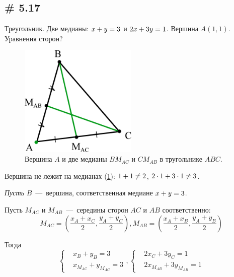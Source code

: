\documentclass[a4paper,12pt]{article}
\begin{document}
  
  \subsection{\# 5.17}
  
  \begin{problem}
      Треугольник.
      Две медианы: $x \hm+ y \hm= 3$ и $2x \hm+ 3y \hm= 1$.
      Вершина $A(1, 1)$.
      Уравнения сторон?
  \end{problem}
  
  \begin{solution}
    \begin{figure}[h]
      \centering
      
      \includegraphics[width=0.5\textwidth]{5-17}
      
      \caption{Вершина $A$ и две медианы $BM_{AC}$ и $CM_{AB}$ в тругольнике $ABC$.}
      \label{fig:5-17}
    \end{figure}
  
    Вершина не лежит на медианах (\ref{fig:5-17}): $1 \hm+ 1 \hm{\not=} 2$, $2 \hm\cdot 1 \hm+ 3 \hm\cdot 1 \hm{\not=} 3$.

    \emph{Пусть} $B$~---~вершина, соответственная медиане $x \hm+ y \hm= 3$.
    
    Пусть $M_{AC}$ и $M_{AB}$~---~середины сторон $AC$ и $AB$ соответственно:
    \[
        M_{AC} = \left(\frac{x_A + x_C}{2}, \frac{y_A + y_C}{2}\right),
        M_{AB} = \left(\frac{x_A + x_B}{2}, \frac{y_A + y_B}{2}\right)
    \]
    
    Тогда
    \[
      \left\{
      \begin{aligned}
        &x_B + y_B = 3\\
        &x_{M_{AC}} + y_{M_{AC}} = 3
      \end{aligned}
      \right.,
      \left\{
      \begin{aligned}
        &2x_C + 3y_C = 1\\
        &2x_{M_{AB}} + 3y_{M_{AB}} = 1
      \end{aligned}
      \right.
    \]
    

\end{solution}
\end{document}
